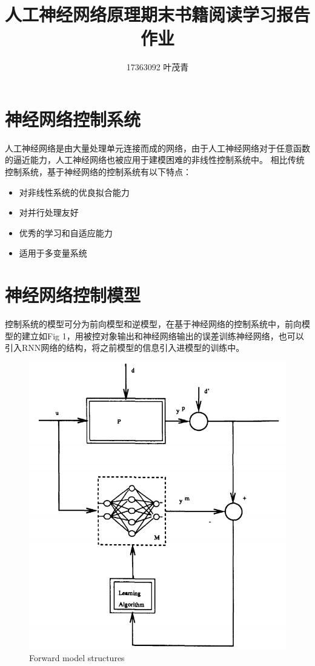 \documentclass[12pt,onecolumn,letterpaper]{article}
\begin{document}
    \title{人工神经网络原理期末书籍阅读学习报告作业}
    \author{17363092 叶茂青}

    \maketitle

    \section{神经网络控制系统}
    人工神经网络是由大量处理单元连接而成的网络，由于人工神经网络对于任意函数的逼近能力，人工神经网络也被应用于建模困难的非线性控制系统中。
    相比传统控制系统，基于神经网络的控制系统有以下特点：
    \begin{itemize}
        \item 对非线性系统的优良拟合能力
        \item 对并行处理友好
        \item 优秀的学习和自适应能力
        \item 适用于多变量系统
    \end{itemize}


    \section{神经网络控制模型}
    控制系统的模型可分为前向模型和逆模型，在基于神经网络的控制系统中，前向模型的建立如Fig 1，用被控对象输出和神经网络输出的误差训练神经网络，也可以引入RNN网络的结构，将之前模型的信息引入进模型的训练中。
    \begin{figure}[htb]
        \centering
        \includegraphics[width=\linewidth]{figure/forward.png}
        \caption{Forward model structures\cite{hunt1992neural}}
    \end{figure}
\end{document}
